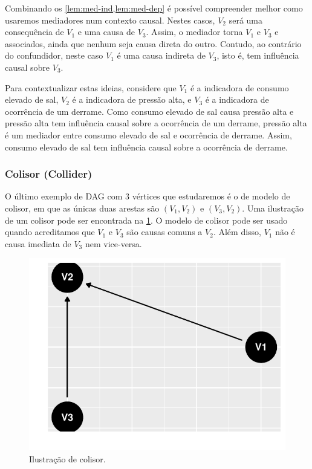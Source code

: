 Combinando os \cref{lem:med-ind,lem:med-dep} é 
possível compreender melhor como 
usaremos mediadores num contexto causal.
Nestes casos, $V_2$ será uma consequência de $V_1$ e
uma causa de $V_3$. Assim, o mediador torna
$V_1$ e $V_3$ e associados, 
ainda que nenhum seja causa direta do outro.
Contudo, ao contrário do confundidor,
neste caso $V_1$ é uma causa indireta de $V_3$,
isto é, tem influência causal sobre $V_3$.

Para contextualizar estas ideias,
considere que $V_1$ é a indicadora de consumo elevado de sal,
$V_2$ é a indicadora de pressão alta, e
$V_3$ é a indicadora de ocorrência de um derrame.
Como consumo elevado de sal causa pressão alta e
pressão alta tem influência causal sobre a ocorrência de um derrame,
pressão alta é um mediador entre consumo elevado de sal e
ocorrência de derrame. Assim,
consumo elevado de sal tem influência causal sobre
a ocorrência de derrame.

\subsubsection{Colisor (Collider)}

O último exemplo de DAG com $3$ vértices que 
estudaremos é o de modelo de colisor, em que
as únicas duas arestas são 
$(V_1, V_2)$ e $(V_3, V_2)$.
Uma ilustração de um colisor
pode ser encontrada 
na \cref{fig:colisor}.
O modelo de colisor pode ser usado quando
acreditamos que $V_1$ e $V_3$ são 
causas comuns a $V_2$. Além disso,
$V_1$ não é causa imediata de $V_3$ 
nem vice-versa.

\begin{knitrout}
\color{fgcolor}\begin{figure}[t]

{\centering \includegraphics[width=\maxwidth]{./figures/colisor-1} 

}

\caption[Ilustração de colisor]{Ilustração de colisor.}\label{fig:colisor}
\end{figure}

\end{knitrout}

